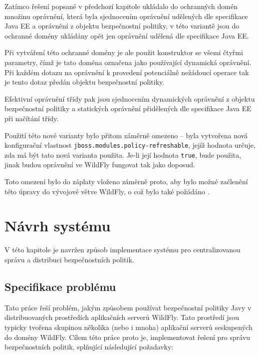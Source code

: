 Zatímco řešení popsané v předchozí kapitole ukládalo do ochranných domén množinu oprávnění,
která byla sjednocením oprávnění udělených dle specifikace Java EE a oprávnění z objektu bezpečnostní politiky,
v této variantě jsou do ochranné domény ukládány opět jen oprávnění udělená dle specifikace Java EE.

Při vytváření této ochranné domény je ale použit konstruktor se všemi čtyřmi parametry, čímž je tato doména označena jako používající dynamická oprávnění.
Při každém dotazu na oprávnění k provedení potenciálně nežádoucí operace tak je tento dotaz předán objektu bezpečnostní politiky.

Efektivní oprávnění třídy pak jsou sjednocením dynamických oprávnění z objektu bezpečnostní politiky a statických oprávnění přidělených dle specifikace Java EE při načítání třídy.

Použití této nové varianty bylo přitom záměrně omezeno -- byla vytvořena nová konfigurační vlastnost {\tt jboss.modules.policy-refreshable},
jejíž hodnota určuje, zda má být tato nová varianta použita. Je-li její hodnota {\tt true}, bude použita,
jinak budou oprávnění ve WildFly fungovat tak jako doposud.

Toto omezení bylo do záplaty vloženo záměrně proto, aby bylo možné začlenění této úpravy do vývojové větve WildFly, o což bylo také požádáno \cite{jmPullRequest}.

\chapter{Návrh systému} \label{navrh}

V této kapitole je navržen způsob implementace systému pro centralizovanou správu a distribuci bezpečnostních politik.

\section{Specifikace problému} \label{specifikaceProblemu}

Tato práce řeší problém, jakým způsobem používat bezpečnostní politiky Javy v distribuovaných prostředích aplikačních serverů WildFly.
Tato prostředí jsou typicky tvořena skupinou několika (nebo i mnoha) aplikační serverů seskupených do domény WildFly.
Cílem této práce proto je, implementovat řešení pro správu bezpečnostních politik, splňující následující požadavky:

